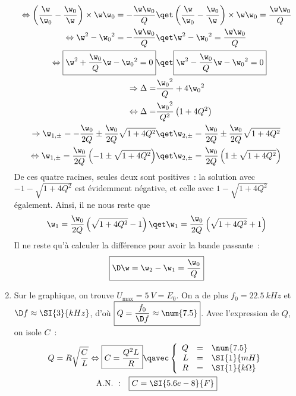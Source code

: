 \documentclass[a4paper, 12pt, final, garamond]{book}
\begin{document}
\begin{enumerate}
\begin{align*}
            \Leftrightarrow
            \left( \frac{\w}{\w_0} - \frac{\w_0}{\w} \right)\times \w\w_0 =
                - \frac{\w\w_0}{Q}
            &\qet
            \left( \frac{\w}{\w_0} - \frac{\w_0}{\w} \right)\times \w\w_0 =
                \frac{\w\w_0}{Q}\\
            \Leftrightarrow
            \w^2 - \w_0{}^2 = -\frac{\w\w_0}{Q}
            &\qet
            \w^2 - \w_0{}^2 = \frac{\w\w_0}{Q}\\
            \Leftrightarrow
            \boxed{
            \w^2 + \frac{\w_0}{Q}\w - \w_0{}^2 = 0}
            &\qet
            \boxed{
            \w^2 - \frac{\w_0}{Q}\w - \w_0{}^2 = 0}\\
            \Rightarrow
            \Delta = &\frac{\w_0{}^2}{Q} + 4\w_0{}^2\\
            \Leftrightarrow
            \Delta = &\frac{\w_0{}^2}{Q^2} \left( 1 + 4Q^2 \right)\\
            \Rightarrow
            \w_{1,\pm} = -\frac{\w_0}{2Q} \pm \frac{\w_0}{2Q} \sqrt{1+4Q^2}
            &\qet
            \w_{2,\pm} = \frac{\w_0}{2Q} \pm \frac{\w_0}{2Q} \sqrt{1+4Q^2}\\
            \Leftrightarrow
            \w_{1,\pm} = \frac{\w_0}{2Q} \left(-1 \pm \sqrt{1+4Q^2}\right)
            &\qet
            \w_{2,\pm} = \frac{\w_0}{2Q} \left(1 \pm \sqrt{1+4Q^2}\right)
        \end{align*}
        De ces quatre racines, seules deux sont positives~: la solution avec $-1 -
        \sqrt{1+4Q^2}$ est évidemment négative, et celle avec $1 - \sqrt{1+4Q^2}$
        également. Ainsi, il ne nous reste que
        \begin{gather*}
            \w_1 = \frac{\w_0}{2Q} \left( \sqrt{1+4Q^2}-1 \right)
            \qet
            \w_1 = \frac{\w_0}{2Q} \left( \sqrt{1+4Q^2}+1 \right)
        \end{gather*}
        Il ne reste qu'à calculer la différence pour avoir la bande passante~:
        \begin{gather*}
            \boxed{\D\w = \w_2 - \w_1 = \frac{\w_0}{Q}}
        \end{gather*}
    \item Sur le graphique, on trouve $U_{\max} = \SI{5}{V} = E_0$. On a de plus
        $f_0 = \SI{22.5}{kHz}$ et $\D f \approx \SI{3}{kHz}$, d'où $\boxed{Q =
        \frac{f_0}{\D f} \approx \num{7.5}}$. Avec l'expression de $Q$, on isole
        $C$~:
        \begin{gather*}
            Q = R \sqrt{\frac{C}{L}}
            \Leftrightarrow
            \boxed{C = \frac{Q^2L}{R}}
            \qavec
            \left\{
                \begin{array}{rcl}
                    Q & = & \num{7.5}\\
                    L & = & \SI{1}{mH}\\
                    R & = & \SI{1}{k\Omega}
                \end{array}
            \right.\\
            \mathrm{A.N.~:}\quad
            \boxed{C = \SI{5.6e-8}{F}}
        \end{gather*}
\end{enumerate}
\end{document}
